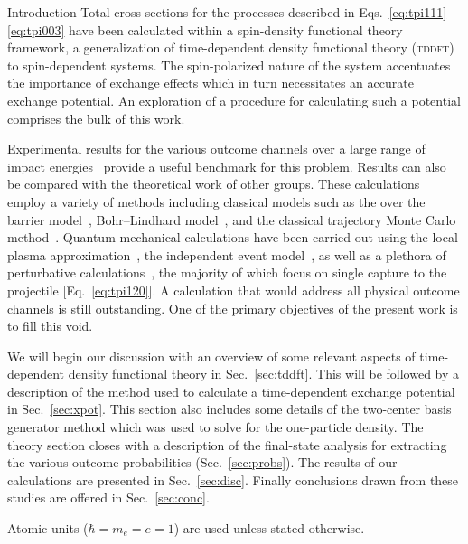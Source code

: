 \documentclass[aps, pra, reprint, groupedaddress, amsfonts, longbibliography,
               amsmath, amssymb, showpacs, nofootinbib]{revtex4-1}
\begin{document}
\begin{section}{Introduction \label{sec:intro}}
   Total cross sections for the processes described in Eqs.~\eqref{eq:tpi111}-\eqref{eq:tpi003} have
   been calculated within a spin-density functional theory~\cite{td-spindep} framework, a
   generalization of time-dependent density functional theory (\textsc{tddft})~\cite{tddft, ullrich} to
   spin-dependent systems. The spin-polarized nature of the system accentuates the importance of
   exchange effects which in turn necessitates an accurate exchange potential. An exploration of a
   procedure for calculating such a potential comprises the bulk of this work.

   Experimental results for the various outcome channels over a large range of impact
   energies~\cite{BS58, HN78, HSE78, dCFdP88, DT-88, Dub-89, ASL91, FTFHLP-95, SSMSM-11} provide a
   useful benchmark for this problem. Results can also be compared with the theoretical work of other
   groups. These calculations employ a variety of methods including classical models such as the over
   the barrier model~\cite{CC-07}, Bohr–Lindhard model~\cite{DYC-08, DLZ-12}, and the classical
   trajectory Monte Carlo method~\cite{GMZ17}. Quantum mechanical calculations have been carried out
   using the local plasma approximation~\cite{MMA03}, the independent event model~\cite{SM-03}, as well
   as a plethora of perturbative calculations~\cite{Mancev96, BOC05, Mancev-07, MG-10, NTC11, GG-12b,
   GAG15}, the majority of which focus on single capture to the projectile [Eq.~\eqref{eq:tpi120}]. A
   calculation that would address all physical outcome channels is still outstanding. One of the primary
   objectives of the present work is to fill this void.

   We will begin our discussion with an overview of some relevant aspects of time-dependent density
   functional theory in Sec.~\ref{sec:tddft}. This will be followed by a description of the method used
   to calculate a time-dependent exchange potential in Sec.~\ref{sec:xpot}. This section also includes
   some details of the two-center basis generator method which was used to solve for the one-particle
   density. The theory section closes with a description of the final-state analysis for extracting
   the various outcome probabilities (Sec.~\ref{sec:probs}). The results of our calculations are
   presented in Sec.~\ref{sec:disc}. Finally conclusions drawn from these studies are offered in
   Sec.~\ref{sec:conc}.

   Atomic units ($\hbar = m_e = e = 1$) are used unless stated otherwise.

\end{section}
\end{document}
